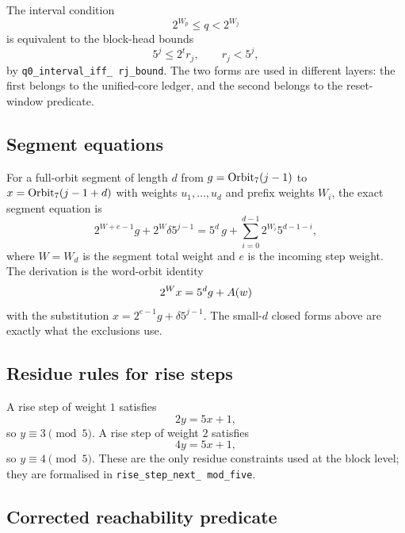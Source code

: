 The interval condition
\begin{equation*}
  2^{W_p}\le q<2^{W_j}
\end{equation*}
is equivalent to the block-head bounds
\begin{equation*}
  5^j\le2^t r_j,\qquad r_j<5^j,
\end{equation*}
by \texttt{q0\_\allowbreak interval\_\allowbreak iff\_\allowbreak
rj\_\allowbreak bound}.  The two forms are used in different layers:
the first belongs to the unified-core ledger, and the second belongs
to the reset-window predicate.

\subsection{Segment equations}

For a full-orbit segment of length $d$ from $g=\mathrm{Orbit}_7(j-1)$ to
$x=\mathrm{Orbit}_7(j-1+d)$ with weights $u_1,\dots,u_d$ and prefix weights
$W_i$, the exact segment equation is
\begin{equation*}
  2^{W+e-1}g+2^W\delta5^{j-1}
    =5^d\,g+\sum_{i=0}^{d-1}2^{W_i}5^{d-1-i},
\end{equation*}
where $W=W_d$ is the segment total weight and $e$ is the incoming
step weight.  The derivation is the word-orbit identity
\begin{equation*}
  2^Wx=5^dg+A(w)
\end{equation*}
with the substitution $x=2^{e-1}g+\delta5^{j-1}$.  The small-$d$
closed forms above are exactly what the exclusions use.

\subsection{Residue rules for rise steps}

A rise step of weight $1$ satisfies
\begin{equation*}
  2y=5x+1,
\end{equation*}
so $y\equiv3\pmod5$.  A rise step of weight $2$ satisfies
\begin{equation*}
  4y=5x+1,
\end{equation*}
so $y\equiv4\pmod5$.  These are the only residue constraints used at
the block level; they are formalised in
\texttt{rise\_\allowbreak step\_\allowbreak next\_\allowbreak
mod\_\allowbreak five}.

\subsection{Corrected reachability predicate}

